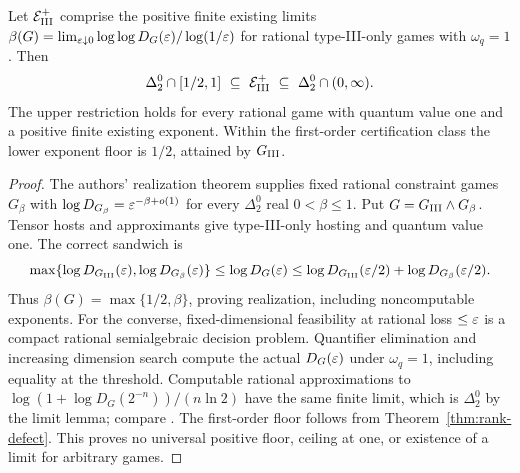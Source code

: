\begin{theorem}\label{thm:exponents}
Let $\mathcal E_{\rm III}^+$ comprise the positive finite existing limits $\beta(G)=\lim_{\varepsilon\downarrow0}\log\log D_G(\varepsilon)/\log(1/\varepsilon)$ for rational type-III-only games with $\omega_q=1$. Then
\[
 \Delta^0_2\cap[1/2,1]\ \subseteq\ \mathcal E_{\rm III}^+
       \ \subseteq\ \Delta^0_2\cap(0,\infty).
\]
The upper restriction holds for every rational game with quantum value one and a positive finite existing exponent. Within the first-order certification class the lower exponent floor is $1/2$, attained by $G_{\mathrm{III}}$.
\end{theorem}
\begin{proof}
The authors' realization theorem \cite[Theorems 1.1 and 1.3]{Uncomputable} supplies fixed rational constraint games $G_\beta$ with $\log D_{G_\beta}=\varepsilon^{-\beta+o(1)}$ for every $\Delta^0_2$ real $0<\beta\le1$. Put $G=G_{\mathrm{III}}\wedge G_\beta$. Tensor hosts and approximants give type-III-only hosting and quantum value one. The correct sandwich is
\[
 \max\{\log D_{G_{\mathrm{III}}}(\varepsilon),\log D_{G_\beta}(\varepsilon)\}
 \le\log D_G(\varepsilon)
 \le\log D_{G_{\mathrm{III}}}(\varepsilon/2)+\log D_{G_\beta}(\varepsilon/2).
\]
Thus $\beta(G)=\max\{1/2,\beta\}$, proving realization, including noncomputable exponents. For the converse, fixed-dimensional feasibility at rational loss $\le\varepsilon$ is a compact rational semialgebraic decision problem. Quantifier elimination and increasing dimension search compute the actual $D_G(\varepsilon)$ under $\omega_q=1$, including equality at the threshold. Computable rational approximations to $\log(1+\log D_G(2^{-n}))/(n\ln2)$ have the same finite limit, which is $\Delta^0_2$ by the limit lemma; compare \cite[Proposition P6.1]{Uncomputable}. The first-order floor follows from Theorem~\ref{thm:rank-defect}. This proves no universal positive floor, ceiling at one, or existence of a limit for arbitrary games.
\end{proof}

